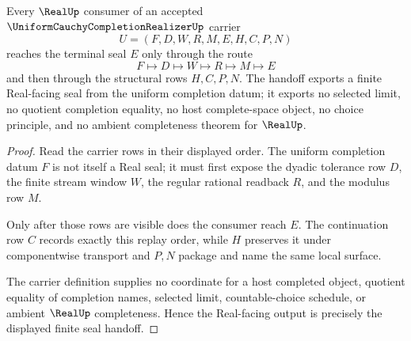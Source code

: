 \begin{theorem}
\label{thm:uniform-cauchy-completion-realizer-real-seal-handoff}
Every $\RealUp$ consumer of an accepted $\UniformCauchyCompletionRealizerUp$ carrier
$$
U=(F,D,W,R,M,E,H,C,P,N)
$$
reaches the terminal seal $E$ only through the route
$$
F \longmapsto D \longmapsto W \longmapsto R \longmapsto M \longmapsto E
$$
and then through the structural rows $H,C,P,N$. The handoff exports a finite Real-facing seal from the uniform completion datum; it exports no selected limit, no quotient completion equality, no host complete-space object, no choice principle, and no ambient completeness theorem for $\RealUp$.
\end{theorem}
\begin{proof}
Read the carrier rows in their displayed order. The uniform completion datum $F$ is not itself a Real seal; it must first expose the dyadic tolerance row $D$, the finite stream window $W$, the regular rational readback $R$, and the modulus row $M$.

Only after those rows are visible does the consumer reach $E$. The continuation row $C$ records exactly this replay order, while $H$ preserves it under componentwise transport and $P,N$ package and name the same local surface.

The carrier definition supplies no coordinate for a host completed object, quotient equality of completion names, selected limit, countable-choice schedule, or ambient $\RealUp$ completeness. Hence the Real-facing output is precisely the displayed finite seal handoff.
\end{proof}


\begin{closurestatus}{\UniformCauchyCompletionRealizerUp}
  \theoryclosure{\seedClosure}
  \formalstatus{\unformalizedV}
\end{closurestatus}
